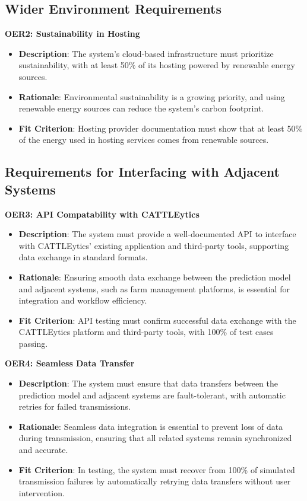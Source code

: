 \documentclass[12pt]{article}
\begin{document}
\subsection{Wider Environment Requirements}
\textbf{OER2: Sustainability in Hosting}
\begin{itemize}
    \item \textbf{Description}: The system’s cloud-based infrastructure must
    prioritize sustainability, with at least 50\% of its hosting powered by
    renewable energy sources.
    \item \textbf{Rationale}: Environmental sustainability is a growing
    priority, and using renewable energy sources can reduce the system’s carbon
    footprint.
    \item \textbf{Fit Criterion}: Hosting provider documentation must show that
    at least 50\% of the energy used in hosting services comes from renewable
    sources.
\end{itemize}

\subsection{Requirements for Interfacing with Adjacent Systems}
\textbf{OER3: API Compatability with CATTLEytics}
\begin{itemize}
    \item \textbf{Description}: The system must provide a well-documented API to
    interface with CATTLEytics' existing application and third-party tools,
    supporting data exchange in standard formats.
    \item \textbf{Rationale}: Ensuring smooth data exchange between the
    prediction model and adjacent systems, such as farm management platforms, is
    essential for integration and workflow efficiency.
    \item \textbf{Fit Criterion}: API testing must confirm successful data
    exchange with the CATTLEytics platform and third-party tools, with 100\% of
    test cases passing.
\end{itemize}
\textbf{OER4: Seamless Data Transfer}
\begin{itemize}
    \item \textbf{Description}: The system must ensure that data transfers
    between the prediction model and adjacent systems are fault-tolerant, with
    automatic retries for failed transmissions.
    \item \textbf{Rationale}: Seamless data integration is essential to prevent
    loss of data during transmission, ensuring that all related systems remain
    synchronized and accurate.
    \item \textbf{Fit Criterion}: In testing, the system must recover from 100\%
    of simulated transmission failures by automatically retrying data transfers
    without user intervention.
\end{itemize}
\end{document}
